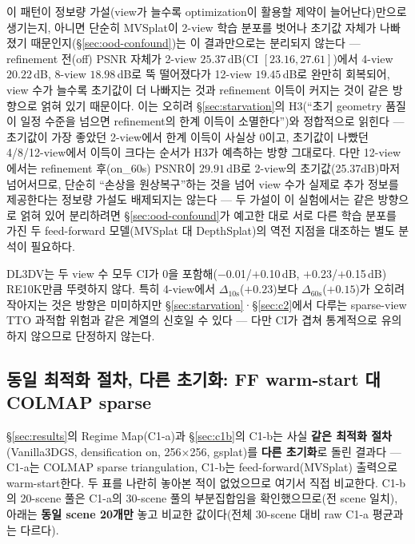 이 패턴이 정보량 가설(view가 늘수록 optimization이 활용할 제약이 늘어난다)만으로 생기는지, 아니면 단순히 MVSplat이 2-view 학습 분포를 벗어나 초기값 자체가 나빠졌기 때문인지(\S\ref{sec:ood-confound})는 이 결과만으로는 분리되지 않는다 — refinement 전(off) PSNR 자체가 2-view $25.37\,$dB(CI $[23.16,27.61]$)에서 4-view $20.22\,$dB, 8-view $18.98\,$dB로 뚝 떨어졌다가 12-view $19.45\,$dB로 완만히 회복되어, view 수가 늘수록 초기값이 더 나빠지는 것과 refinement 이득이 커지는 것이 같은 방향으로 얽혀 있기 때문이다. 이는 오히려 \S\ref{sec:starvation}의 H3(``초기 geometry 품질이 일정 수준을 넘으면 refinement의 한계 이득이 소멸한다'')와 정합적으로 읽힌다 — 초기값이 가장 좋았던 2-view에서 한계 이득이 사실상 0이고, 초기값이 나빴던 4/8/12-view에서 이득이 크다는 순서가 H3가 예측하는 방향 그대로다. 다만 12-view에서는 refinement 후(on\_60s) PSNR이 $29.91\,$dB로 2-view의 초기값(25.37dB)마저 넘어서므로, 단순히 ``손상을 원상복구''하는 것을 넘어 view 수가 실제로 추가 정보를 제공한다는 정보량 가설도 배제되지는 않는다 — 두 가설이 이 실험에서는 같은 방향으로 얽혀 있어 분리하려면 \S\ref{sec:ood-confound}가 예고한 대로 서로 다른 학습 분포를 가진 두 feed-forward 모델(MVSplat 대 DepthSplat)의 역전 지점을 대조하는 별도 분석이 필요하다.

DL3DV는 두 view 수 모두 CI가 0을 포함해($-$0.01/$+$0.10\,dB, $+$0.23/$+$0.15\,dB) RE10K만큼 뚜렷하지 않다. 특히 4-view에서 $\Delta_{10\text{s}}$($+0.23$)보다 $\Delta_{60\text{s}}$($+0.15$)가 오히려 작아지는 것은 방향은 미미하지만 \S\ref{sec:starvation}·\S\ref{sec:c2}에서 다루는 sparse-view TTO 과적합 위험과 같은 계열의 신호일 수 있다 — 다만 CI가 겹쳐 통계적으로 유의하지 않으므로 단정하지 않는다.


\subsection{동일 최적화 절차, 다른 초기화: FF warm-start 대 COLMAP sparse}
\label{sec:init-comparison}

\S\ref{sec:results}의 Regime Map(C1-a)과 \S\ref{sec:c1b}의 C1-b는 사실 \textbf{같은 최적화 절차}(Vanilla3DGS, densification on, 256$\times$256, gsplat)를 \textbf{다른 초기화}로 돌린 결과다 — C1-a는 COLMAP sparse triangulation, C1-b는 feed-forward(MVSplat) 출력으로 warm-start한다. 두 표를 나란히 놓아본 적이 없었으므로 여기서 직접 비교한다. C1-b의 20-scene 풀은 C1-a의 30-scene 풀의 부분집합임을 확인했으므로(전 scene 일치), 아래는 \textbf{동일 scene 20개만} 놓고 비교한 값이다(전체 30-scene 대비 raw C1-a 평균과는 다르다).

